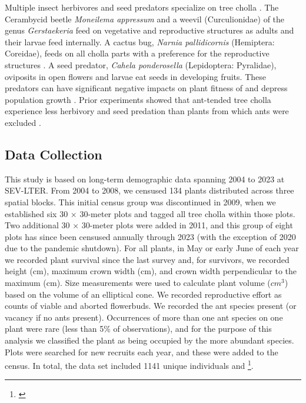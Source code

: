 \documentclass[11pt]{article}
\newcommand{\tom}[2]{{\color{red}{#1}}\footnote{\textit{\color{red}{#2}}}}
\begin{document}
Multiple insect herbivores and seed predators specialize on tree cholla \citep{Mann1969}. 
The Cerambycid beetle \textit{Moneilema appressum} and a weevil (Curculionidae) of the genus \textit{Gerstaekeria} feed on vegetative and reproductive structures as adults and their larvae feed internally. 
A cactus bug, \textit{Narnia pallidicornis} (Hemiptera: Coreidae), feeds on all cholla parts with a preference for the reproductive structures \citep{Miller2006}.
A seed predator, \textit{Cahela ponderosella} (Lepidoptera: Pyralidae), oviposits in open flowers and larvae eat seeds in developing fruits. 
These predators can have significant negative impacts on plant fitness of and depress population growth \citep{Miller2009}.
Prior experiments showed that ant-tended tree cholla experience less herbivory and seed predation than plants from which ants were excluded \citep{Miller2007,Ohm2014}. 

\subsection*{Data Collection}
This study is based on long-term demographic data spanning 2004 to 2023 at SEV-LTER. 
From 2004 to 2008, we censused 134 plants distributed across three spatial blocks. 
This initial census group was discontinued in 2009, when we established six 30 $\times$ 30-meter plots and tagged all tree cholla within those plots. 
Two additional 30 $\times$ 30-meter plots were added in 2011, and this group of eight plots has since been censused annually through 2023 (with the exception of 2020 due to the pandemic shutdown). 
For all plants, in May or early June of each year we recorded plant survival since the last survey and, for survivors, we recorded height (cm), maximum crown width (cm), and crown width perpendicular to the maximum (cm).
Size measurements were used to calculate plant volume ($cm^3$) based on the volume of an elliptical cone. 
We recorded reproductive effort as counts of viable and aborted flowerbuds. 
We recorded the ant species present (or vacancy if no ants present).
Occurrences of more than one ant species on one plant were rare (less than 5\% of observations), and for the purpose of this analysis we classified the plant as being occupied by the more abundant species. 
Plots were searched for new recruits each year, and these were added to the census.
In total, the data set included 1141 unique individuals and \tom{19 plant-year observations}{It is 19 years but the number of plant-year observations should be the total number of rows in the data set}. 
\end{document}
